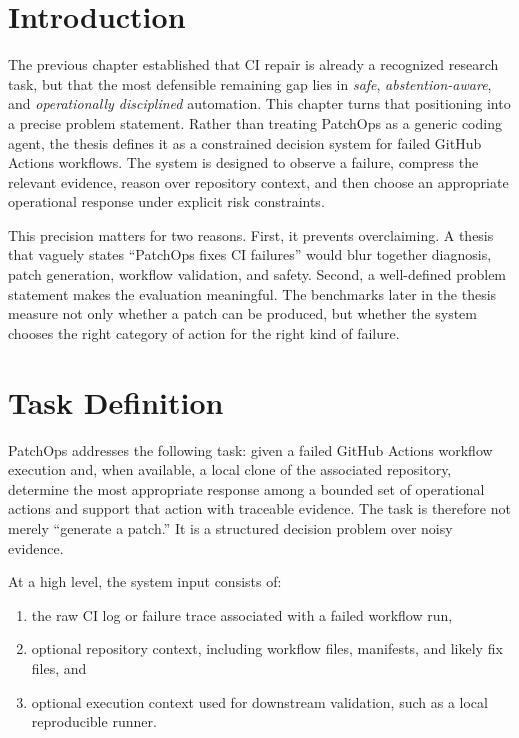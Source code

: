 \section{Introduction}

The previous chapter established that CI repair is already a recognized research task, but that the most
defensible remaining gap lies in \emph{safe}, \emph{abstention-aware}, and \emph{operationally disciplined}
automation. This chapter turns that positioning into a precise problem statement. Rather than treating PatchOps
as a generic coding agent, the thesis defines it as a constrained decision system for failed GitHub Actions
workflows. The system is designed to observe a failure, compress the relevant evidence, reason over repository
context, and then choose an appropriate operational response under explicit risk constraints.

This precision matters for two reasons. First, it prevents overclaiming. A thesis that vaguely states ``PatchOps
fixes CI failures'' would blur together diagnosis, patch generation, workflow validation, and safety. Second, a
well-defined problem statement makes the evaluation meaningful. The benchmarks later in the thesis measure not
only whether a patch can be produced, but whether the system chooses the right category of action for the right
kind of failure.

\section{Task Definition}

PatchOps addresses the following task: given a failed GitHub Actions workflow execution and, when available, a
local clone of the associated repository, determine the most appropriate response among a bounded set of
operational actions and support that action with traceable evidence. The task is therefore not merely
``generate a patch.'' It is a structured decision problem over noisy evidence.

At a high level, the system input consists of:

\begin{enumerate}
\item the raw CI log or failure trace associated with a failed workflow run,
\item optional repository context, including workflow files, manifests, and likely fix files, and
\item optional execution context used for downstream validation, such as a local reproducible runner.
\end{enumerate}

